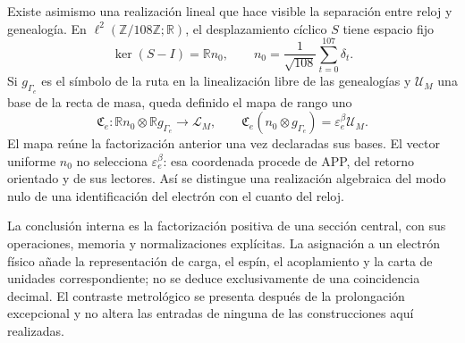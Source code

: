 Existe asimismo una realización lineal que hace visible la separación
entre reloj y genealogía. En
\(\ell^2(\mathbb Z/108\mathbb Z;\mathbb R)\), el desplazamiento
cíclico \(S\) tiene espacio fijo
\[
 \ker(S-I)=\mathbb R n_0,\qquad
 n_0=\frac1{\sqrt{108}}\sum_{t=0}^{107}\delta_t.
\]
Si \(g_{\Gamma_e}\) es el símbolo de la ruta en la linealización libre
de las genealogías y \(\mathcal U_M\) una base de la recta de masa,
queda definido el mapa de rango uno
\begin{equation}
 \mathfrak C_e:
 \mathbb R n_0\otimes\mathbb R g_{\Gamma_e}\longrightarrow\mathcal L_M,
 \qquad
 \mathfrak C_e(n_0\otimes g_{\Gamma_e})
 =\varepsilon_e^\beta\mathcal U_M.
 \label{eq:el-rango-uno}
\end{equation}
El mapa reúne la factorización anterior una vez declaradas sus bases.
El vector uniforme \(n_0\) no selecciona \(\varepsilon_e^\beta\):
esa coordenada procede de APP, del retorno orientado y de sus lectores.
Así se distingue una realización algebraica del modo nulo de una
identificación del electrón con el cuanto del reloj.

La conclusión interna es la factorización positiva de una sección
central, con sus operaciones, memoria y normalizaciones explícitas. La
asignación a un electrón físico añade la representación de carga, el
espín, el acoplamiento y la carta de unidades correspondiente; no se
deduce exclusivamente de una coincidencia decimal. El contraste
metrológico se presenta después de la prolongación excepcional y no altera
las entradas de ninguna de las construcciones aquí realizadas.




